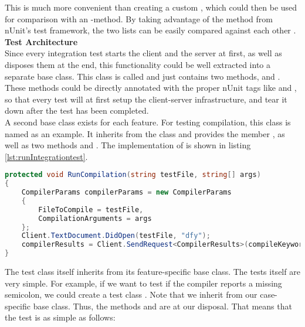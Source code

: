 This is much more convenient than creating a custom , which could then be used for comparison with an -method.
By taking advantage of the method  from nUnit's test framework,
the two lists can be easily compared against each other \cite{nunitCollectionAssert}. \\

\textbf{Test Architecture}\\
Since every integration test starts the client and the server at first, as well as disposes them at the end,
this functionality could be well extracted into a separate base class.
This class is called  and just contains two methods,  and .
These methods could be directly annotated with the proper nUnit tags like \code{[SetUp]} and \code{[TearDown]},
so that every test will at first setup the client-server infrastructure,
and tear it down after the test has been completed.\\

A second base class exists for each feature.
For testing compilation, this class is named  as an example.
It inherits from the  class and provides the member ,
as well as two methods  and .
The implementation of  is shown in listing \ref{lst:runIntegrationtest}.\\

\begin{lstlisting}[language=csharp, caption={Running a Compilation Integration test}, captionpos=b, label={lst:runIntegrationtest}]
protected void RunCompilation(string testFile, string[] args)
{
    CompilerParams compilerParams = new CompilerParams
    {
        FileToCompile = testFile,
        CompilationArguments = args
    };
    Client.TextDocument.DidOpen(testFile, "dfy");
    compilerResults = Client.SendRequest<CompilerResults>(compileKeyword, compilerParams, CancellationSource.Token).Result;
}
\end{lstlisting}


The test class itself inherits from its feature-specific base class.
The tests itself are very simple.
For example, if we want to test if the compiler reports a missing semicolon, we could create a test class .
Note that we inherit from our case-specific base class.
Thus, the methods  and  are at our disposal.
That means that the test is as simple as follows:

